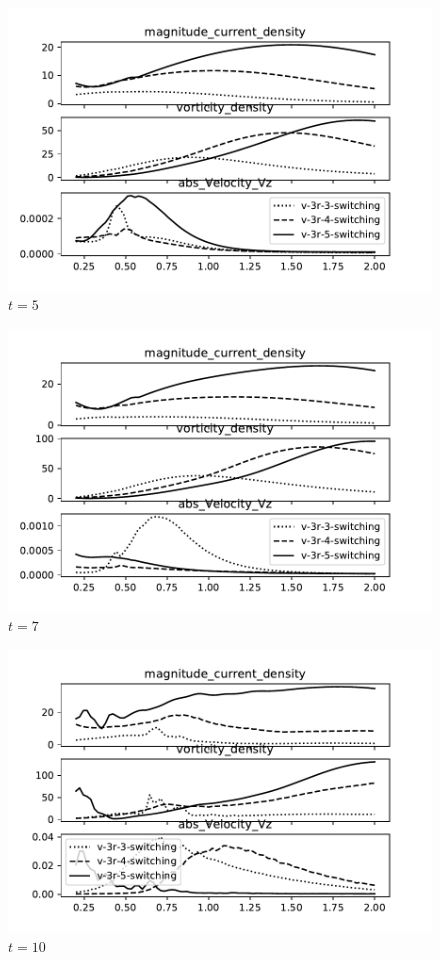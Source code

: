 \begin{figure}[h]
  \centering
  \includegraphics[width=0.8\linewidth]{./images/null_point_khi/azimuthal_averages_v-3_5.pdf}
  \caption{$t=5$}%
  \label{fig:azimuthal_averages_v-3_5}
\end{figure}

\begin{figure}[h]
  \centering
  \includegraphics[width=0.8\linewidth]{./images/null_point_khi/azimuthal_averages_v-3_7.pdf}
  \caption{$t=7$}%
  \label{fig:azimuthal_averages_v-3_7}
\end{figure}

\begin{figure}[h]
  \centering
  \includegraphics[width=0.8\linewidth]{./images/null_point_khi/azimuthal_averages_v-3_10.pdf}
  \caption{$t=10$}%
  \label{fig:azimuthal_averages_v-3_10}
\end{figure}

